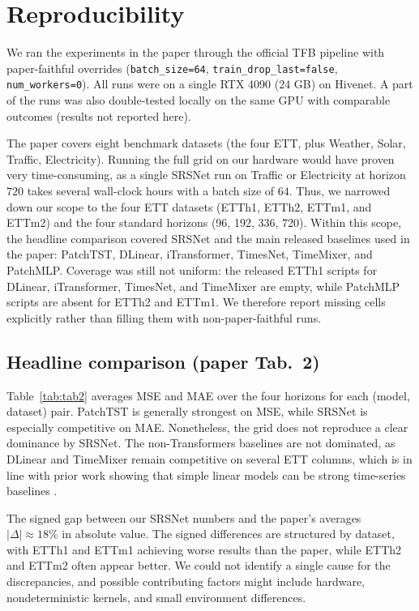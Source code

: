 \documentclass[10pt]{article}
\begin{document}
\section{Reproducibility}
\label{sec:results-repro}

We ran the experiments in the paper through the official TFB pipeline
\citep{qiu2024tfb} with paper-faithful overrides
(\texttt{batch\_size=64}, \texttt{train\_drop\_last=false},
\texttt{num\_workers=0}). All runs were on a single RTX 4090
($24$ GB) on Hivenet. A part of the runs was also double-tested
locally on the same GPU with comparable outcomes (results not reported
here). 

The paper covers eight benchmark datasets (the four ETT, plus
Weather, Solar, Traffic, Electricity). Running the full grid on our
hardware would have proven very time-consuming, as a single SRSNet run on Traffic or
Electricity at horizon $720$ takes several wall-clock hours with a batch size of $64$.
Thus, we narrowed down our scope to the four ETT
datasets (ETTh1, ETTh2, ETTm1, and ETTm2) and the four standard horizons (96, 192, 336, 720).
Within this scope, the headline comparison
covered SRSNet and the main released baselines used in the paper:
PatchTST, DLinear, iTransformer, TimesNet, TimeMixer, and PatchMLP.
Coverage was still not uniform: the released ETTh1
scripts for DLinear, iTransformer, TimesNet, and TimeMixer are
empty, while PatchMLP scripts are absent for ETTh2 and
ETTm1. We therefore report missing cells explicitly rather than
filling them with non-paper-faithful runs.
\subsection{Headline comparison (paper Tab.~2)}

Table~\ref{tab:tab2} averages MSE and MAE over the four horizons
for each (model, dataset) pair. PatchTST is generally strongest on
MSE, while SRSNet is especially competitive on MAE. Nonetheless, the grid does
not reproduce a clear dominance by SRSNet.
The non-Transformers baselines are not dominated, as DLinear and TimeMixer
remain competitive on several ETT columns, which is in line with prior work showing that simple
linear models can be strong time-series baselines \citep{zeng2023dlinear}.

The signed gap between our SRSNet numbers and the paper's averages
$|\Delta| \approx 18\%$ in absolute value. The signed differences are
structured by dataset, with ETTh1 and ETTm1 achieving worse results than the paper,
while ETTh2 and ETTm2 often appear better. We could not identify a single cause for the
discrepancies, and possible contributing factors might include hardware, nondeterministic kernels,
and small environment differences.
\end{document}
